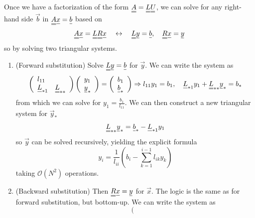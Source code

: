 
Once we have a factorization of the form $\mat{A} = \mat{L} \mat{U}$, we can solve 
for any right-hand side $\vec{b}$ in $\mat{A}\vec{x} = \vec{b}$ based on
\begin{equation}
    \mat{A} \vec{x} = \mat{L} \mat{R} \vec{x} \quad \leftrightarrow \quad \mat{L} \vec{y} = \vec{b}, \quad \mat{R} \vec{x} = \vec{y}
\end{equation}
so by solving two triangular systems.

\begin{enumerate}
    \item (\textcolor{blue1}{Forward substitution}) Solve $\mat{L} \vec{y} = \vec{b}$ for $\vec{y}$. We can write the system as
    \begin{equation}
        \left(\begin{array}{ll}
        l_{11} & \\
        \vec{L}_{* 1} & \mat{L}_{* *}
        \end{array}\right)\left(\begin{array}{l}
        y_1 \\
        \vec{y}_*
        \end{array}\right)=\left(\begin{array}{l}
        b_1 \\
        \vec{b}_*
        \end{array}\right) \Rightarrow l_{11} y_1=b_1, \quad \vec{L}_{* 1} y_1+\mat{L}_{* *} \vec{y}_*=b_*
    \end{equation}
    from which we can solve for $y_1 = \frac{b_1}{l_{11}}$. We can then construct a new triangular
    system for $\vec{y}_*$
    \begin{equation}
        \mat{L}_{* *} \vec{y}_* = \vec{b}_* - \vec{L}_{* 1} y_1
    \end{equation}
    so $\vec{y}$ can be solved recursively, yielding the explicit formula
    \begin{equation}
        y_i=\frac{1}{l_{i i}}\left(b_i-\sum_{k=1}^{i-1} l_{i k} y_k\right)
    \end{equation}
    taking $\mathcal{O}(N^2)$ operations.
    \item (\textcolor{blue1}{Backward substitution}) Then $\mat{R} \vec{x} = \vec{y}$ for $\vec{x}$. The logic is the same as for forward substitution, 
    but bottom-up. We can write the system as
    \begin{equation}
        \left(\begin{array}{ll}

\end{array}
\end{equation}
\end{enumerate}
